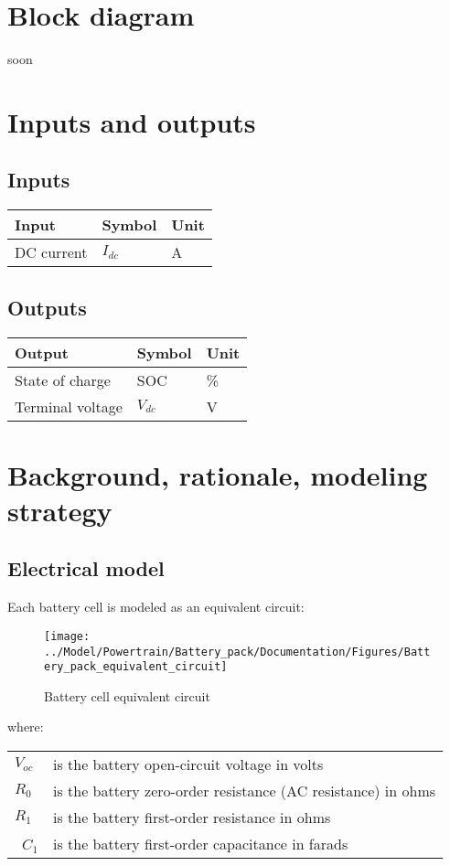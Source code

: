 \documentclass[../SimBALink.tex]{subfiles}
\begin{document}
\section{Block diagram}
soon

\section{Inputs and outputs}
	\subsection{Inputs}
	\begin{tabular}{ l | l | l  }
		Input					&	Symbol		&	Unit		\\	\hline
		DC current				&	$I_{dc}$		&	A		\\
	\end{tabular}
	
	\subsection{Outputs}
	\begin{tabular}{ l | l | l  }
		Output					&	Symbol		&	Unit		\\	\hline
		State of charge			&	SOC			&	\%		\\
		Terminal voltage			&	$V_{dc}$		&	V		\\
	\end{tabular}
	
\section{Background, rationale, modeling strategy}
	\subsection{Electrical model}
		Each battery cell is modeled as an equivalent circuit:
		
		\begin{figure}[h!]
				\centering
				\texttt{[image: ../Model/Powertrain/Battery\_pack/Documentation/Figures/Battery\_pack\_equivalent\_circuit]}
				\caption{Battery cell equivalent circuit}
				\label{fig:battery_pack_equivalent_circuit}
		\end{figure}
		\FloatBarrier
		
		where:
		\begin{center}
		\begin{tabular}{l l}
			$V_{oc}$		&	is the battery open-circuit voltage in volts	\\
			$R_{0}$		&	is the battery zero-order resistance (AC resistance) in ohms \\
			$R_{1}$		& 	is the battery first-order resistance in ohms \\\
			$C_{1}$		&	is the battery first-order capacitance in farads \\
		\end{tabular}
		\end{center}
		
\end{document}
